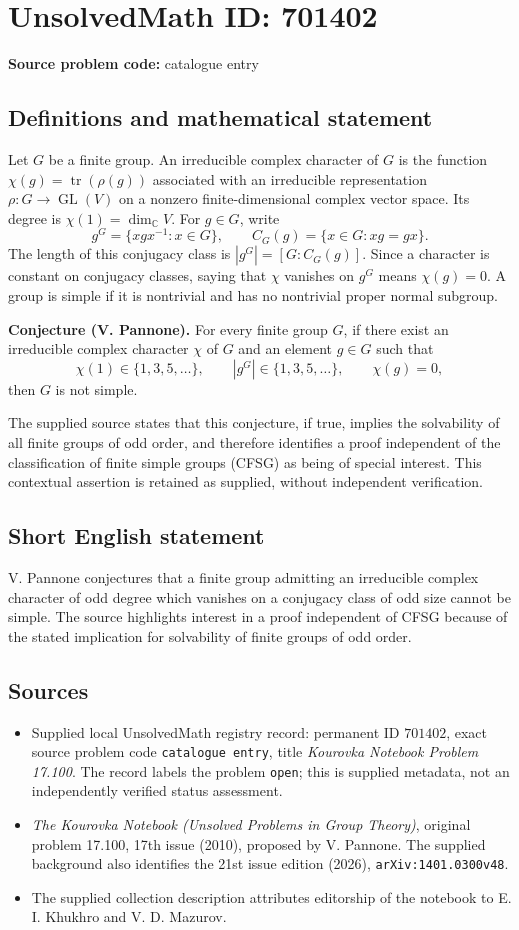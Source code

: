 \documentclass[11pt]{article}
\newcommand{\C}{\mathbb{C}}
\begin{document}
\section*{UnsolvedMath ID: 701402}
\textbf{Source problem code:} catalogue entry
\subsection{Definitions and mathematical statement}
Let \(G\) be a finite group. An irreducible complex character of \(G\) is the function \(\chi(g)=\operatorname{tr}(\rho(g))\) associated with an irreducible representation \(\rho:G\to\operatorname{GL}(V)\) on a nonzero finite-dimensional complex vector space. Its degree is \(\chi(1)=\dim_{\C}V\). For \(g\in G\), write
\[
g^G=\{xgx^{-1}:x\in G\},\qquad C_G(g)=\{x\in G:xg=gx\}.
\]
The length of this conjugacy class is \(|g^G|=[G:C_G(g)]\). Since a character is constant on conjugacy classes, saying that \(\chi\) vanishes on \(g^G\) means \(\chi(g)=0\). A group is simple if it is nontrivial and has no nontrivial proper normal subgroup.

\textbf{Conjecture (V. Pannone).} For every finite group \(G\), if there exist an irreducible complex character \(\chi\) of \(G\) and an element \(g\in G\) such that
\[
\chi(1)\in\{1,3,5,\ldots\},\qquad |g^G|\in\{1,3,5,\ldots\},\qquad \chi(g)=0,
\]
then \(G\) is not simple.

The supplied source states that this conjecture, if true, implies the solvability of all finite groups of odd order, and therefore identifies a proof independent of the classification of finite simple groups (CFSG) as being of special interest. This contextual assertion is retained as supplied, without independent verification.
\subsection{Short English statement}
V. Pannone conjectures that a finite group admitting an irreducible complex character of odd degree which vanishes on a conjugacy class of odd size cannot be simple. The source highlights interest in a proof independent of CFSG because of the stated implication for solvability of finite groups of odd order.
\subsection{Sources}
\begin{itemize}
\item Supplied local UnsolvedMath registry record: permanent ID \(701402\), exact source problem code \texttt{catalogue entry}, title \emph{Kourovka Notebook Problem 17.100}. The record labels the problem \texttt{open}; this is supplied metadata, not an independently verified status assessment.
\item \emph{The Kourovka Notebook (Unsolved Problems in Group Theory)}, original problem 17.100, 17th issue (2010), proposed by V. Pannone. The supplied background also identifies the 21st issue edition (2026), \texttt{arXiv:1401.0300v48}.
\item The supplied collection description attributes editorship of the notebook to E. I. Khukhro and V. D. Mazurov.
\end{itemize}
\end{document}
